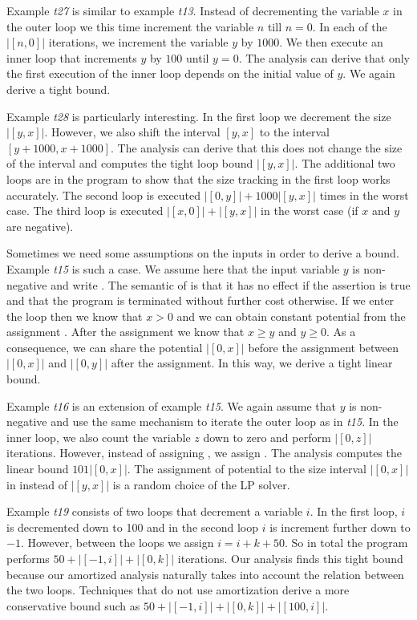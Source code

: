 \documentclass[nocopyrightspace,preprint]{sigplanconf}
\begin{document}
{Example \emph{t27} is similar to example \emph{t13}.  Instead of
decrementing the variable $x$ in the outer loop we this time increment
the variable $n$ till $n = 0$.  In each of the $|[n,0]|$ iterations,
we increment the variable $y$ by $1000$.  We then execute an inner
loop that increments $y$ by $100$ until $y=0$.  The analysis can
derive that only the first execution of the inner loop depends on the
initial value of $y$.  We again derive a tight bound.

Example \emph{t28} is particularly interesting.  In the first loop we
decrement the size $|[y,x]|$.  However, we also shift the interval
$[y,x]$ to the interval $[y+1000,x+1000]$.  The analysis can derive
that this does not change the size of the interval and computes the
tight loop bound $|[y,x]|$.  The additional two loops are in the
program to show that the size tracking in the first loop works
accurately.  The second loop is executed $|[0,y]| + 1000|[y,x]|$ times
in the worst case.  The third loop is executed $|[x,0]| + |[y,x]|$ in
the worst case (if $x$ and $y$ are negative).

Sometimes we need some assumptions on the inputs in order to derive a
bound.  Example \emph{t15} is such a case.  We assume here that the
input variable $y$ is non-negative and write .  The
semantic of  is that it has no effect if the assertion is
true and that the program is terminated without further cost
otherwise.  If we enter the loop then we know that $x>0$ and we can
obtain constant potential from the assignment .  After the
assignment we know that $x\geq y$ and $y\geq 0$.  As a consequence, we
can share the potential $|[0,x]|$ before the assignment 
between $|[0,x]|$ and $|[0,y]|$ after the assignment.  In this way, we
derive a tight linear bound.

Example \emph{t16} is an extension of example \emph{t15}. We again
assume that $y$ is non-negative and use the same mechanism to iterate
the outer loop as in \emph{t15}.  In the inner loop, we also count the
variable $z$ down to zero and perform $|[0,z]|$ iterations.  However,
instead of assigning , we assign .  The analysis
computes the linear bound $101|[0,x]|$.  The
assignment of potential to the size interval $|[0,x]|$ in instead of
$|[y,x]|$ is a random choice of the LP solver.

Example \emph{t19} consists of two loops that decrement a variable
$i$.  In the first loop, $i$ is decremented down to 100 and in the
second loop $i$ is increment further down to $-1$.  However, between
the loops we assign $i=i+k+50$.  So in total the program performs $50
+ |[-1,i]| + |[0,k]|$ iterations.  Our analysis finds this tight bound
because our amortized analysis naturally takes into account the
relation between the two loops.  Techniques that do not use
amortization derive a more conservative bound such as $50 + |[-1,i]| +
|[0,k]| + |[100,i]|$.

}
\end{document}
